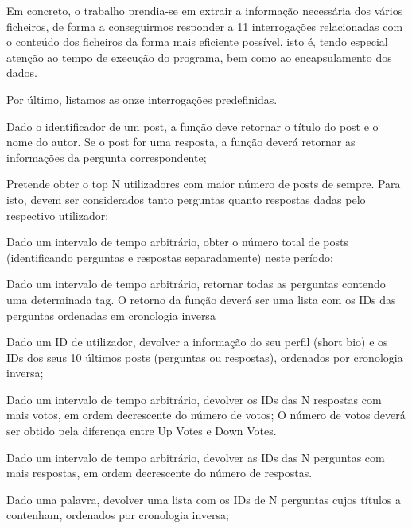 \documentclass[a4paper]{report}
\begin{document}
Em concreto, o trabalho prendia-se em extrair a informação necessária dos vários
ficheiros, de forma a conseguirmos responder a 11 interrogações relacionadas com
o conteúdo dos ficheiros da forma mais eficiente possível, isto é, tendo especial
atenção ao tempo de execução do programa, bem como ao encapsulamento dos dados.

Por último, listamos as onze interrogações predefinidas.
\begin{itemize}

\begin{item} Dado o identificador de um post, a função deve retornar
o título do post e o nome do autor. Se o post for uma resposta, a função deverá
retornar as informações da pergunta correspondente;\end{item}
\begin{item} Pretende obter o top N utilizadores com maior número
de posts de sempre. Para isto, devem ser considerados tanto perguntas
quanto respostas dadas pelo respectivo utilizador;\end{item}
\begin{item} Dado um intervalo de tempo arbitrário, obter o número
total de posts (identificando perguntas e respostas separadamente) neste
período;\end{item}
\begin{item} Dado um intervalo de tempo arbitrário, retornar todas
as perguntas contendo uma determinada tag. O retorno da função deverá ser
uma lista com os IDs das perguntas ordenadas em cronologia inversa\end{item}
\begin{item} Dado um ID de utilizador, devolver a informação do
seu perfil (short bio) e os IDs dos seus 10 últimos posts (perguntas ou respostas),
ordenados por cronologia inversa;\end{item}
\begin{item} Dado um intervalo de tempo arbitrário, devolver os IDs das N
respostas com mais votos, em ordem decrescente do número de votos; O número de
votos deverá ser obtido pela diferença entre Up Votes e Down Votes.\end{item}
\begin{item} Dado um intervalo de tempo arbitrário, devolver as IDs das N
perguntas com mais respostas, em ordem decrescente do número de respostas.\end{item}
\begin{item} Dado uma palavra, devolver uma lista com os IDs de N perguntas cujos
títulos a contenham, ordenados por cronologia inversa;\end{item}

\end{itemize}
\end{document}
